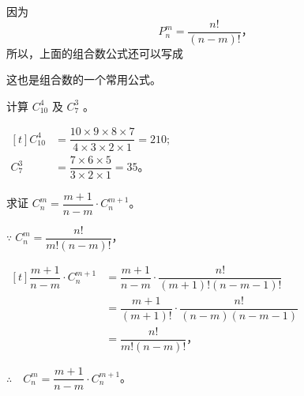 因为
$$ P_n^m = \dfrac{n!}{(n-m)!} \text{，} $$
所以，上面的组合数公式还可以写成
\begin{center}
\end{center}
这也是组合数的一个常用公式。

\liti 计算 $C_{10}^4$ 及 $C_7^3$ 。

\jie \; $\begin{aligned}[t]
    C_{10}^4 &= \dfrac{10 \times 9 \times 8 \times 7}{4 \times 3 \times 2 \times 1} = 210;\\
    C_7^3 &= \dfrac{7 \times 6 \times 5}{3 \times 2 \times 1} = 35 \text{。}
\end{aligned}$


\liti 求证 $C_n^m = \dfrac{m+1}{n-m} \cdot C_n^{m+1}$。

\zhengming \; $\because \; C_n^m = \dfrac{n!}{m! (n-m)!}$，

$\begin{aligned}[t]
    \dfrac{m+1}{n-m} \cdot C_n^{m+1} &= \dfrac{m+1}{n-m} \cdot \dfrac{n!}{(m+1)! (n-m-1)!} \\
        &=\dfrac{m+1}{(m+1)!} \cdot \dfrac{n!}{(n-m) (n-m-1)} \\
        &= \dfrac{n!}{m! (n-m)!} \text{，}
\end{aligned}$

$\therefore \quad C_n^m = \dfrac{m+1}{n-m} \cdot C_n^{m+1}$。


